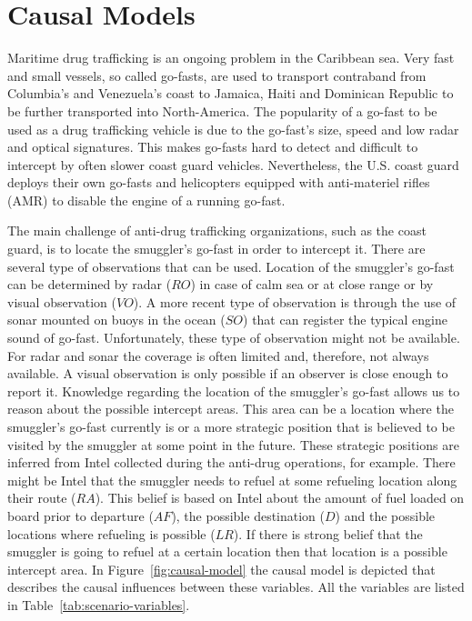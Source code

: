 \documentclass[conference]{IEEEtran}
\begin{document}
\section{Causal Models}


Maritime drug trafficking is an ongoing problem in the Caribbean sea. Very fast and small vessels, so called go-fasts, are used to transport contraband from Columbia's and Venezuela's coast to Jamaica, Haiti and Dominican Republic to be further transported into North-America. The popularity of a go-fast to be used as a drug trafficking vehicle is due to the go-fast's size, speed and low radar and optical signatures. This makes go-fasts hard to detect and difficult to intercept by often slower coast guard vehicles. Nevertheless, the U.S. coast guard deploys their own go-fasts and helicopters equipped with anti-materiel rifles (AMR) to disable the engine of a running go-fast. 

The main challenge of anti-drug trafficking organizations, such as the coast guard, is to locate the smuggler's go-fast in order to intercept it. There are several type of observations that can be used. Location of the smuggler's go-fast can be determined by radar ($RO$) in case of calm sea or at close range or by visual observation ($VO$). A more recent type of observation is through the use of sonar mounted on buoys in the ocean ($SO$) that can register the typical engine sound of go-fast. Unfortunately, these type of observation might not be available. For radar and sonar the coverage is often limited and, therefore, not always available. A visual observation is only possible if an observer is close enough to report it. Knowledge regarding the location of the smuggler's go-fast allows us to reason about the possible intercept areas. This area can be a location where the smuggler's go-fast currently is or a more strategic position that is believed to be visited by the smuggler at some point in the future. These strategic positions are inferred from Intel collected during the anti-drug operations, for example. There might be Intel that the smuggler needs to refuel at some refueling location along their route ($RA$). This belief is based on Intel about the amount of fuel loaded on board prior to departure ($AF$), the possible destination ($D$) and the possible locations where refueling is possible ($LR$). If there is strong belief that the smuggler is going to refuel at a certain location then that location is a possible intercept area. In Figure~\ref{fig:causal-model} the causal model is depicted that describes the causal influences between these variables. All the variables are listed in Table~\ref{tab:scenario-variables}.
\end{document}

